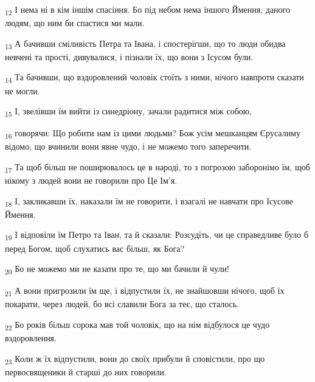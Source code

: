 \begin{tcolorbox}
\textsubscript{12} І нема ні в кім іншім спасіння. Бо під небом нема іншого Ймення, даного людям, що ним би спастися ми мали.
\end{tcolorbox}
\begin{tcolorbox}
\textsubscript{13} А бачивши сміливість Петра та Івана, і спостерігши, що то люди обидва невчені та прості, дивувалися, і пізнали їх, що вони з Ісусом були.
\end{tcolorbox}
\begin{tcolorbox}
\textsubscript{14} Та бачивши, що вздоровлений чоловік стоїть з ними, нічого навпроти сказати не могли.
\end{tcolorbox}
\begin{tcolorbox}
\textsubscript{15} І, звелівши їм вийти із синедріону, зачали радитися між собою,
\end{tcolorbox}
\begin{tcolorbox}
\textsubscript{16} говорячи: Що робити нам із цими людьми? Бож усім мешканцям Єрусалиму відомо, що вчинили вони явне чудо, і не можемо того заперечити.
\end{tcolorbox}
\begin{tcolorbox}
\textsubscript{17} Та щоб більш не поширювалось це в народі, то з погрозою заборонімо їм, щоб нікому з людей вони не говорили про Це Ім'я.
\end{tcolorbox}
\begin{tcolorbox}
\textsubscript{18} І, закликавши їх, наказали їм не говорити, і взагалі не навчати про Ісусове Ймення.
\end{tcolorbox}
\begin{tcolorbox}
\textsubscript{19} І відповіли їм Петро та Іван, та й сказали: Розсудіть, чи це справедливе було б перед Богом, щоб слухатись вас більш, як Бога?
\end{tcolorbox}
\begin{tcolorbox}
\textsubscript{20} Бо не можемо ми не казати про те, що ми бачили й чули!
\end{tcolorbox}
\begin{tcolorbox}
\textsubscript{21} А вони пригрозили їм ще, і відпустили їх, не знайшовши нічого, щоб їх покарати, через людей, бо всі славили Бога за теє, що сталось.
\end{tcolorbox}
\begin{tcolorbox}
\textsubscript{22} Бо років більш сорока мав той чоловік, що на нім відбулося це чудо вздоровлення.
\end{tcolorbox}
\begin{tcolorbox}
\textsubscript{23} Коли ж їх відпустили, вони до своїх прибули й сповістили, про що первосвященики й старші до них говорили.
\end{tcolorbox}
